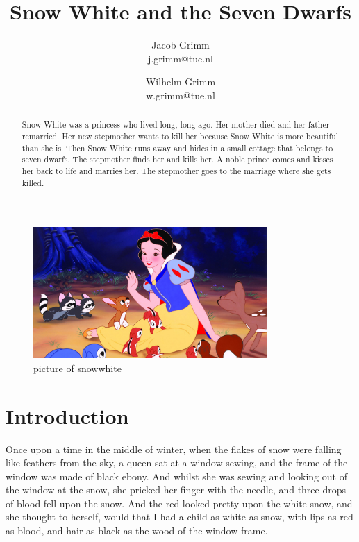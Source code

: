 \documentclass[a4paper,11pt]{article}
\begin{document}
\title{Snow White and the Seven Dwarfs}
\author{Jacob Grimm\\j.grimm@tue.nl \and Wilhelm Grimm\\w.grimm@tue.nl}
\date{}
\maketitle

\begin{figure}[!ht]
\begin{center}
\includegraphics[bb=0 0 1000 563,height=5cm]{snowwhite.jpg}
\caption{picture of snowwhite}
\label{fig:snowwhite}
\end{center}
\end{figure}

\begin{abstract}
\noindent
Snow White was a princess who lived long, long ago. Her mother died
and her father remarried. Her new stepmother wants to kill her because
Snow White is more beautiful than she is. Then Snow White runs away and
hides in a small cottage that belongs to seven dwarfs. The stepmother
finds her and kills her. A noble prince comes and kisses her back to
life and marries her. The stepmother goes to the marriage where she gets killed.
\end{abstract}


\tableofcontents
\section{Introduction}

Once upon a time in the middle of winter, when the flakes of
snow were falling like feathers from the sky, a queen sat at
a window sewing, and the frame of the window was made of black
ebony.  And whilst she was sewing and looking out of the window
at the snow, she pricked her finger with the needle, and three
drops of blood fell upon the snow.  And the red looked pretty
upon the white snow, and she thought to herself, would that I had
a child as white as snow, with lips as red as blood, and hair as black as the
wood of the window-frame.
\end{document}
